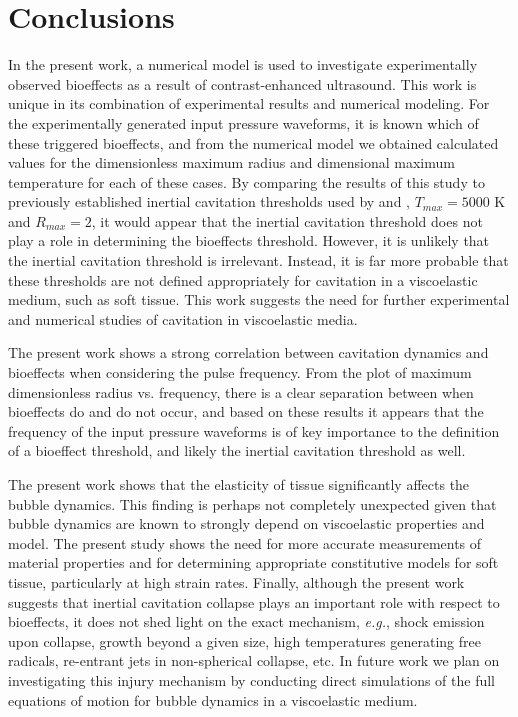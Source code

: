 \documentclass[%
preprint,%
author-year,%
]{jasatex}
\begin{document}


\section{Conclusions}
\label{sec:conclusions}

In the present work, a numerical model is used
to investigate experimentally observed bioeffects as a result of
contrast-enhanced ultrasound. This work is unique in its 
combination of experimental results and numerical modeling.
For the experimentally generated input
pressure waveforms, it is known which of these triggered bioeffects,
and from the numerical model we obtained calculated values for
the dimensionless maximum radius and dimensional maximum temperature for each of these cases.  By comparing the
results of this study to previously established inertial cavitation
thresholds used by \cite{apfel1991} and \cite{yang2005},
$T_{max}=5000$ K and $R_{max}=2$, it would appear that the inertial
cavitation threshold does not play a role in determining the bioeffects
threshold.  However, it is unlikely that the inertial cavitation
threshold is irrelevant. Instead, it is far more probable that these
thresholds are not defined appropriately for cavitation in a
viscoelastic medium, such as soft tissue. This work suggests the need for
further experimental and numerical studies of cavitation in viscoelastic media.

The present work shows a strong correlation between cavitation dynamics and bioeffects
when considering the pulse frequency.
From the plot of maximum
dimensionless radius vs. frequency, there is a clear separation
between when bioeffects do and do not occur, and based on these
results it appears that the frequency of the input pressure waveforms
is of key importance to the definition of a bioeffect threshold, and
likely the inertial cavitation threshold as well. 

The present work shows that the elasticity of tissue significantly
affects the bubble dynamics. This finding is perhaps not completely
unexpected given that bubble dynamics are known to strongly depend
on viscoelastic properties and model. The present study shows the need
for more accurate measurements of material properties and for
determining appropriate constitutive models for soft tissue,
particularly at high strain rates. Finally, although the present work
suggests that inertial cavitation collapse plays an important role with respect
to bioeffects, it does not shed light on the exact mechanism,
\emph{e.g.}, shock emission upon collapse, growth beyond a given size,
high temperatures generating free radicals, re-entrant jets in
non-spherical collapse, etc.  In future work we plan on investigating 
this injury mechanism by conducting direct simulations of
the full equations of motion for bubble dynamics in a viscoelastic medium.
\end{document}
